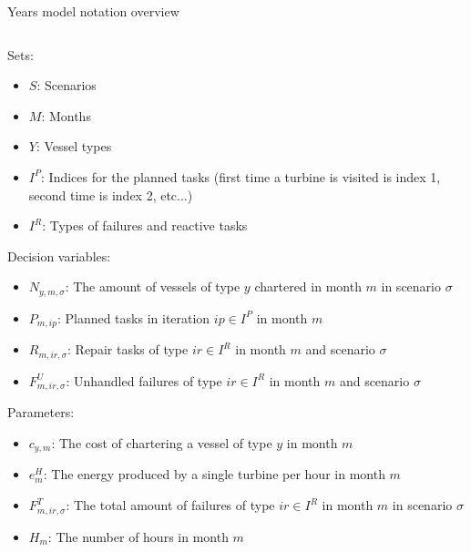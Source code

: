 \documentclass{beamer}
\newcommand{\smalld}{\tiny}
\begin{document}
\begin{frame}{Years model notation overview}
\smalld
\begin{columns}
\begin{column}{.48\textwidth}
Sets:
\begin{itemize}
\item $S$: Scenarios
\item $M$: Months
\item $Y$: Vessel types
\item $I^P$: Indices for the planned tasks (first time a turbine is visited is index 1, second time is index 2, etc...)
\item $I^R$: Types of failures and reactive tasks
\end{itemize}

Decision variables:
\begin{itemize}
\item $N_{y,m,\sigma}$: The amount of vessels of type $y$ chartered in month $m$ in scenario $\sigma$
\item $P_{m,ip}$: Planned tasks in iteration $ip \in I^P$ in month $m$
\item $R_{m,ir,\sigma}$: Repair tasks of type $ir \in I^R$ in month $m$ and scenario $\sigma$
\item $F^U_{m,ir,\sigma}$: Unhandled failures of type $ir \in I^R$ in month $m$ and scenario $\sigma$
\end{itemize}

Parameters:
\begin{itemize}
\item $c_{y,m}$: The cost of chartering a vessel of type $y$ in month $m$
\item $e^H_m$: The energy produced by a single turbine per hour in month $m$
\item $F^T_{m,ir,\sigma}$: The total amount of failures of type $ir \in I^R$ in month $m$ in scenario $\sigma$
\item $H_m$: The number of hours in month $m$
\end{itemize}
\end{column}

\hfill


\end{columns}
\end{frame}
\end{document}
